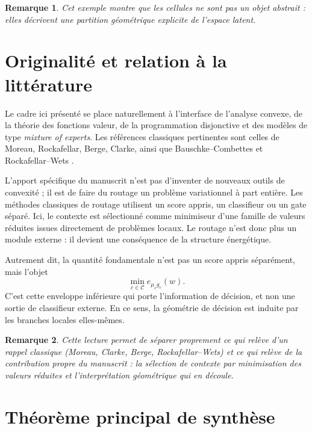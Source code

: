 \documentclass[11pt,a4paper]{article}
\newtheorem{remark}{Remarque}[section]
\newcommand{\Ccal}{\mathcal C}
\begin{document}
\begin{remark}
Cet exemple montre que les cellules ne sont pas un objet abstrait : elles décrivent une partition géométrique explicite de l'espace latent.
\end{remark}

\section{Originalité et relation à la littérature}

Le cadre ici présenté se place naturellement à l'interface de l'analyse convexe, de la théorie des fonctions valeur, de la programmation disjonctive et des modèles de type \emph{mixture of experts}. Les références classiques pertinentes sont celles de Moreau, Rockafellar, Berge, Clarke, ainsi que Bauschke--Combettes et Rockafellar--Wets \cite{Moreau1965,Rockafellar1970,Berge1963,Clarke1983,BauschkeCombettes2017,RockafellarWets1998}.

L'apport spécifique du manuscrit n'est pas d'inventer de nouveaux outils de convexité ; il est de faire du routage un problème variationnel à part entière. Les méthodes classiques de routage utilisent un score appris, un classifieur ou un gate séparé. Ici, le contexte est sélectionné comme minimiseur d'une famille de valeurs réduites issues directement de problèmes locaux. Le routage n'est donc plus un module externe : il devient une conséquence de la structure énergétique.

Autrement dit, la quantité fondamentale n'est pas un score appris séparément, mais l'objet
\[
\min_{c\in\Ccal} e_{\mu_c g_c}(w).
\]
C'est cette enveloppe inférieure qui porte l'information de décision, et non une sortie de classifieur externe. En ce sens, la géométrie de décision est induite par les branches locales elles-mêmes.

\begin{remark}
Cette lecture permet de séparer proprement ce qui relève d'un rappel classique (Moreau, Clarke, Berge, Rockafellar--Wets) et ce qui relève de la contribution propre du manuscrit : la sélection de contexte par minimisation des valeurs réduites et l'interprétation géométrique qui en découle.
\end{remark}

\section{Théorème principal de synthèse}
\end{document}
